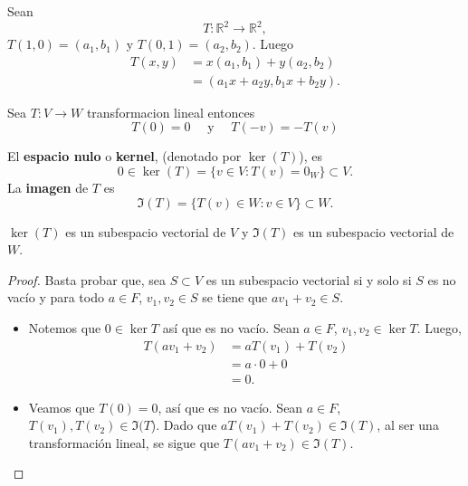 \documentclass[12pt,a4paper]{book}
\begin{document}
    \begin{ejemplo}
        Sean
        \begin{equation*}
            T: \mathbb{R}^{2} \to \mathbb{R}^{2},
        \end{equation*}
        $T(1,0) = (a_1, b_1)$ y $T(0, 1) = (a_2, b_2)$. Luego
        \begin{align*}
            T(x, y) & = x(a_1, b_1) + y(a_2, b_2)\\
            & = (a_1x + a_2y, b_1x + b_2y).
        \end{align*}
    \end{ejemplo}

    Sea $T:V\to W$ transformacion lineal entonces
    \begin{equation*}
        T(0)=0\quad\text{ y }\quad T(-v)=-T(v)
    \end{equation*}

    \begin{definicion}
        El \textbf{espacio nulo} o \textbf{kernel}, (denotado por $\ker(T)$), es
        \begin{equation*}
            0\in\ker(T)=\{v\in V:T(v)=0_{W}\}\subset V.
        \end{equation*}
        La \textbf{imagen} de $T$ es
        \begin{equation*}
            \Im(T)=\{T(v)\in W:v\in V\}\subset W.
        \end{equation*}
    \end{definicion}

    \begin{proposicion}
        $\ker(T)$ es un subespacio vectorial de $V$ y $\Im(T)$ es un subespacio vectorial de $W$.
    \end{proposicion}

    \begin{proof}
        Basta probar que, sea $S \subset V$ es un subespacio vectorial si y solo si $S$ es no vacío y para todo $a \in F$, $v_1, v_2 \in S$ se tiene que $av_1 + v_2 \in S$.
        \begin{itemize}
            \item[(1)] Notemos que $0 \in \ker{T}$ así que es no vacío. Sean $a \in F$, $v_1, v_2 \in \ker{T}$. Luego,
            \begin{align*}
                T(av_1 + v_2) & = aT(v_1) + T(v_2)\\
                & = a \cdot 0 + 0\\
                & = 0.
            \end{align*}
            \item[(2)] Veamos que $T(0) = 0$, así que es no vacío. Sean $a \in F$, $T(v_1), T(v_2) \in \Im (T$). Dado que $aT(v_1) + T(v_2) \in \Im (T)$, al ser una transformación lineal, se sigue que $T(av_1 + v_2) \in \Im (T)$.
        \end{itemize}
    \end{proof}
\end{document}
